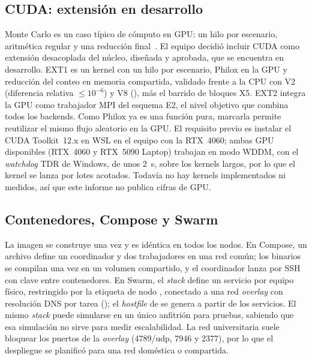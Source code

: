 \subsection{CUDA: extensión en desarrollo}

Monte Carlo es un caso típico de cómputo en GPU: un hilo por escenario, aritmética regular y una reducción final~\cite{benguigui2012}. El equipo decidió incluir CUDA como extensión desacoplada del núcleo, diseñada y aprobada, que se encuentra en desarrollo. EXT1 es un kernel con un hilo por escenario, Philox en la GPU y reducción del conteo en memoria compartida, validado frente a la CPU con V2 (diferencia relativa $\le 10^{-6}$) y V8 (), más el barrido de bloques X5. EXT2 integra la GPU como trabajador MPI del esquema E2, el nivel objetivo que combina todos los backends. Como Philox ya es una función pura, marcarla  permite reutilizar el mismo flujo aleatorio en la GPU. El requisito previo es instalar el CUDA Toolkit~12.x en WSL en el equipo con la RTX~4060; ambas GPU disponibles (RTX~4060 y RTX~5090 Laptop) trabajan en modo WDDM, con el \emph{watchdog} TDR de Windows, de unos 2~s, sobre los kernels largos, por lo que el kernel se lanza por lotes acotados. Todavía no hay kernels implementados ni medidos, así que este informe no publica cifras de GPU.

\subsection{Contenedores, Compose y Swarm}

La imagen  se construye una vez y es idéntica en todos los nodos. En Compose, un archivo define un coordinador y dos trabajadores en una red común; los binarios se compilan una vez en un volumen compartido, y el coordinador lanza  por SSH con clave entre contenedores. En Swarm, el \emph{stack} define un servicio por equipo físico, restringido por la etiqueta de nodo , conectado a una red \emph{overlay} con resolución DNS por tarea (); el \emph{hostfile} de  se genera a partir de los servicios. El mismo \emph{stack} puede simularse en un único anfitrión para pruebas, sabiendo que esa simulación no sirve para medir escalabilidad. La red universitaria suele bloquear los puertos de la \emph{overlay} (4789/udp, 7946 y 2377), por lo que el despliegue se planificó para una red doméstica o compartida.
